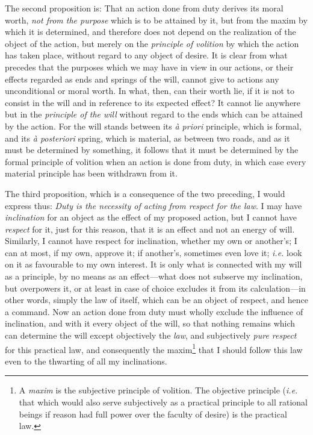 The second proposition is: That an action done from duty derives its
moral worth, \textit{not from the purpose} which is to be attained by
it, but from the maxim by which it is determined, and therefore does
not depend on the realization of the object of the action, but merely
on the \textit{principle of volition} by which the action has taken
place, without regard to any object of desire. It is clear from what
precedes that the purposes which we may have in view in our actions,
or their effects regarded as ends and springs of the will, cannot give
to actions any unconditional or moral worth. In what, then, can their
worth lie, if it is not to consist in the will and in reference to its
expected effect? It cannot lie anywhere but in the \textit{principle
of the will} without regard to the ends which can be attained by the
action. For the will stands between its \textit{\`a priori} principle,
which is formal, and its \textit{\`a posteriori} spring, which is
material, as between two roads, and as it must be determined by
something, it follows that it must be determined by the formal
principle of volition when an action is done from duty, in which case
every material principle has been withdrawn from it.

The third proposition, which is a consequence of the two preceding, I
would express thus: \textit{Duty is the necessity of acting from
respect for the law}. I may have \textit{inclination} for an object as
the effect of my proposed action, but I cannot have \textit{respect}
for it, just for this reason, that it is an effect and not an energy
of will. Similarly, I cannot have respect for inclination, whether my
own or another's; I can at most, if my own, approve it; if another's,
sometimes even love it; \textit{i.e.} look on it as favourable to my
own interest. It is only what is connected with my will as a
principle, by no means as an effect---what does not subserve my
inclination, but overpowers it, or at least in case of choice excludes
it from its calculation---in other words, simply the law  of
itself, which can be an object of respect, and hence a command. Now an
action done from duty must wholly exclude the influence of
inclination, and with it every object of the will, so that nothing
remains which can determine the will except objectively the
\textit{law}, and subjectively \textit{pure respect} for this
practical law, and consequently the maxim\footnote{A \textit{maxim} is
the subjective principle of volition. The objective principle
(\textit{i.e.} that which would also serve subjectively as a practical
principle to all rational beings if reason had full power over the
faculty of desire) is the practical law.} that I should follow this
law even to the thwarting of all my inclinations.

